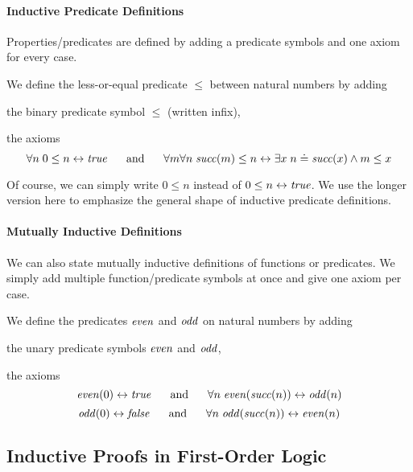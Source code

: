 \paragraph{Inductive Predicate Definitions}
Properties/predicates are defined by adding a predicate symbols and one axiom for every case.

\begin{example}\label{ex:foldef:nat5}
We define the less-or-equal predicate $\leq$ between natural numbers by adding
\begin{compactitem}
\item the binary predicate symbol $\leq$ (written infix),
\item the axioms \[\forall n\;0\leq n\leftrightarrow \mathit{true} \hspace*{.5cm}\;\mathrm{and}\;\hspace*{.5cm} \forall m\forall n\;\mathit{succ}(m)\leq n\leftrightarrow\exists x\;n\doteq \mathit{succ}(x)\wedge m\leq x\]
\end{compactitem}
\end{example}

\begin{remark}
Of course, we can simply write $0\leq n$ instead of $0\leq n\leftrightarrow \mathit{true}$.
We use the longer version here to emphasize the general shape of inductive predicate definitions.
\end{remark}

\paragraph{Mutually Inductive Definitions}
We can also state mutually inductive definitions of functions or predicates.
We simply add multiple function/predicate symbols at once and give one axiom per case.

\begin{example}\label{ex:foldef:nat6}
We define the predicates $\mathit{even}$ and $\mathit{odd}$ on natural numbers by adding
\begin{compactitem}
\item the unary predicate symbols $\mathit{even}$ and $\mathit{odd}$,
\item the axioms \[\mathit{even}(0)\leftrightarrow \mathit{true} \hspace*{.5cm}\;\mathrm{and}\;\hspace*{.5cm} \forall n\;\mathit{even}(\mathit{succ}(n))\leftrightarrow \mathit{odd}(n)\]
                 \[\mathit{odd}(0)\leftrightarrow \mathit{false} \hspace*{.5cm}\;\mathrm{and}\;\hspace*{.5cm} \forall n\;\mathit{odd}(\mathit{succ}(n))\leftrightarrow \mathit{even}(n)\]
\end{compactitem}
\end{example}

\subsection{Inductive Proofs in First-Order Logic}


